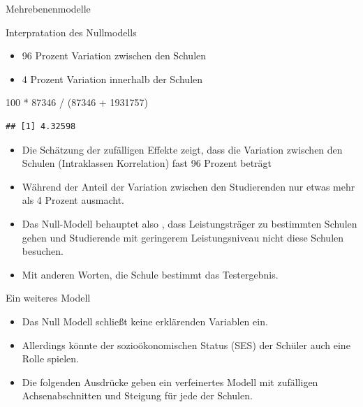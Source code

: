 \documentclass[ignorenonframetext,]{beamer}
\newenvironment{Shaded}{}{}
\newcommand{\DecValTok}[1]{\textcolor[rgb]{0.25,0.63,0.44}{{#1}}}
\newcommand{\StringTok}[1]{\textcolor[rgb]{0.25,0.44,0.63}{{#1}}}
\newcommand{\NormalTok}[1]{{#1}}
\providecommand{\tightlist}{%
\setlength{\itemsep}{0pt}\setlength{\parskip}{0pt}}
\begin{document}
\begin{frame}[fragile]{Mehrebenenmodelle}
\begin{block}{Interpratation des Nullmodells}

\begin{itemize}
\tightlist
\item
  96 Prozent Variation zwischen den Schulen
\item
  4 Prozent Variation innerhalb der Schulen
\end{itemize}

\begin{Shaded}
\begin{Highlighting}[]
\DecValTok{100} \NormalTok{*}\StringTok{ }\DecValTok{87346} \NormalTok{/}\StringTok{ }\NormalTok{(}\DecValTok{87346} \NormalTok{+}\StringTok{ }\DecValTok{1931757}\NormalTok{)}
\end{Highlighting}
\end{Shaded}

\begin{verbatim}
## [1] 4.32598
\end{verbatim}

\begin{itemize}
\item
  Die Schätzung der zufälligen Effekte zeigt, dass die Variation
  zwischen den Schulen (Intraklassen Korrelation) fast 96 Prozent
  beträgt
\item
  Während der Anteil der Variation zwischen den Studierenden nur etwas
  mehr als 4 Prozent ausmacht.
\item
  Das Null-Modell behauptet also , dass Leistungsträger zu bestimmten
  Schulen gehen und Studierende mit geringerem Leistungsniveau nicht
  diese Schulen besuchen.
\item
  Mit anderen Worten, die Schule bestimmt das Testergebnis.
\end{itemize}

\end{block}

\begin{block}{Ein weiteres Modell}

\begin{itemize}
\tightlist
\item
  Das Null Modell schließt keine erklärenden Variablen ein.
\item
  Allerdings könnte der sozioökonomischen Status (SES) der Schüler auch
  eine Rolle spielen.
\item
  Die folgenden Ausdrücke geben ein verfeinertes Modell mit zufälligen
  Achsenabschnitten und Steigung für jede der Schulen.
\end{itemize}


\end{block}
\end{frame}
\end{document}
